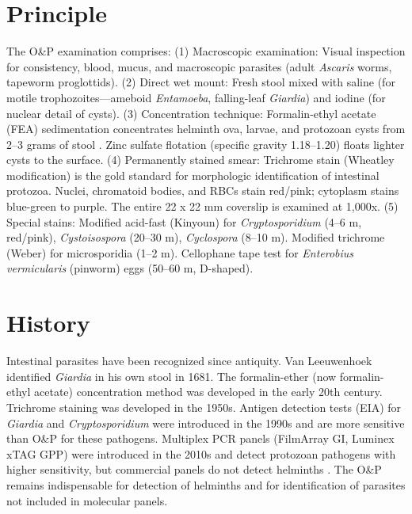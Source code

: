 \section*{Principle}
The O\&P examination comprises: (1) Macroscopic examination: Visual inspection for consistency, blood, mucus, and macroscopic parasites (adult \textit{Ascaris} worms, tapeworm proglottids). (2) Direct wet mount: Fresh stool mixed with saline (for motile trophozoites---ameboid \textit{Entamoeba}, falling-leaf \textit{Giardia}) and iodine (for nuclear detail of cysts). (3) Concentration technique: Formalin-ethyl acetate (FEA) sedimentation concentrates helminth ova, larvae, and protozoan cysts from 2--3 grams of stool \cite{cdc2024dpdx}. Zinc sulfate flotation (specific gravity 1.18--1.20) floats lighter cysts to the surface. (4) Permanently stained smear: Trichrome stain (Wheatley modification) is the gold standard for morphologic identification of intestinal protozoa. Nuclei, chromatoid bodies, and RBCs stain red/pink; cytoplasm stains blue-green to purple. The entire 22 x 22 mm coverslip is examined at 1,000x. (5) Special stains: Modified acid-fast (Kinyoun) for \textit{Cryptosporidium} (4--6 \textmu m, red/pink), \textit{Cystoisospora} (20--30 \textmu m), \textit{Cyclospora} (8--10 \textmu m). Modified trichrome (Weber) for microsporidia (1--2 \textmu m). Cellophane tape test for \textit{Enterobius vermicularis} (pinworm) eggs (50--60 \textmu m, D-shaped).

\section*{History}
Intestinal parasites have been recognized since antiquity. Van Leeuwenhoek identified \textit{Giardia} in his own stool in 1681. The formalin-ether (now formalin-ethyl acetate) concentration method was developed in the early 20th century. Trichrome staining was developed in the 1950s. Antigen detection tests (EIA) for \textit{Giardia} and \textit{Cryptosporidium} were introduced in the 1990s and are more sensitive than O\&P for these pathogens. Multiplex PCR panels (FilmArray GI, Luminex xTAG GPP) were introduced in the 2010s and detect protozoan pathogens with higher sensitivity, but commercial panels do not detect helminths \cite{mchardy2014detection}. The O\&P remains indispensable for detection of helminths and for identification of parasites not included in molecular panels.

